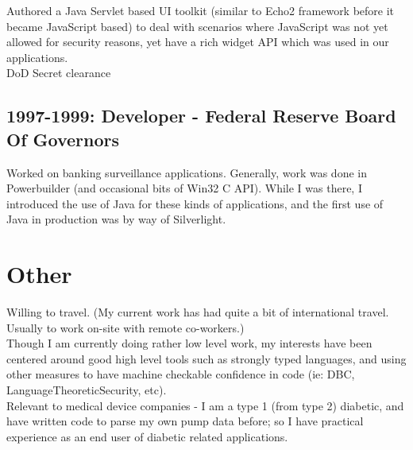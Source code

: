 \documentclass[margin]{res}
\begin{document}
\begin{resume}
Authored a Java Servlet based UI toolkit (similar to Echo2 framework before it became JavaScript based) to deal with scenarios where JavaScript was not yet allowed for security reasons, yet have a rich widget API which was used in our applications. \\
DoD Secret clearance

\subsection{1997-1999: Developer - Federal Reserve Board Of Governors}
Worked on banking surveillance applications.
Generally, work was done in Powerbuilder (and occasional bits of Win32 C API).
While I was there, I introduced the use of Java for these kinds of applications,
and the first use of Java in production was by way of Silverlight.
 
\section{Other}
Willing to travel.  (My current work has had quite a bit of international travel.  Usually to work on-site with remote co-workers.) \\

Though I am currently doing rather low level work, 
my interests have been centered around good high level tools
such as strongly typed languages, and using other measures
to have machine checkable confidence in code (ie: DBC, LanguageTheoreticSecurity, etc). \\

Relevant to medical device companies - I am a type 1 (from type 2) diabetic, and have written code to parse my own pump data before; so I have practical experience as an end user of diabetic related applications. 


 
\end{resume}
\end{document}
